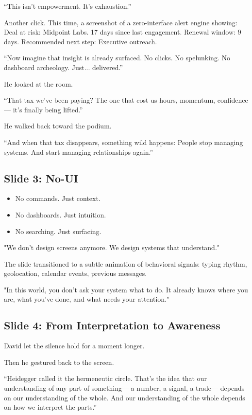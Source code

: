 “This isn’t empowerment.
It’s exhaustion.”

Another click. This time, a screenshot of a zero-interface alert engine showing:
Deal at risk: Midpoint Labs. 17 days since last engagement. Renewal window: 9 days. Recommended next step: Executive outreach.

“Now imagine that insight is already surfaced.
No clicks. No spelunking. No dashboard archeology.
Just... delivered.”

He looked at the room.

“That tax we’ve been paying?
The one that cost us hours, momentum, confidence—
it’s finally being lifted.”

He walked back toward the podium.

“And when that tax disappears, something wild happens:
People stop managing systems.
And start managing relationships again.”

\subsection{Slide 3: No-UI}

\begin{itemize}
\item No commands. Just context.
\item No dashboards. Just intuition.
\item No searching. Just surfacing.
\end{itemize}

"We don’t design screens anymore. We design systems that understand."

The slide transitioned to a subtle animation of behavioral signals: typing rhythm, geolocation, 
calendar events, previous messages.

"In this world, you don’t ask your system what to do. It already knows where you are, what 
you’ve done, and what needs your attention."

\subsection{Slide 4: From Interpretation to Awareness}

David let the silence hold for a moment longer.

Then he gestured back to the screen.

“Heidegger called it the hermeneutic circle.
That’s the idea that our understanding of any part of something—
a number, a signal, a trade—
depends on our understanding of the whole.
And our understanding of the whole depends on how we interpret the parts.”

